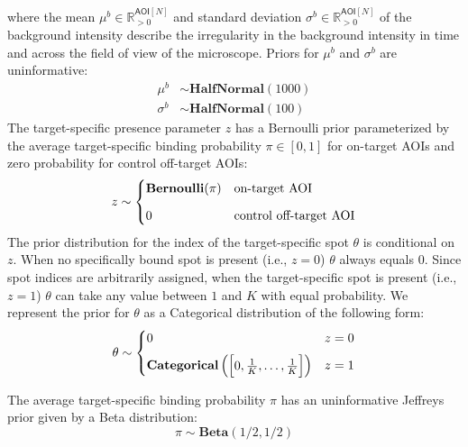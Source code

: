 \noindent
where the mean $\mu^b \in \mathbb{R}_{>0}^{\mathsf{AOI}[N]}$ and standard deviation $\sigma^b \in \mathbb{R}_{>0}^{\mathsf{AOI}[N]}$ of the background intensity describe the irregularity in the background intensity in time and across the field of view of the microscope. Priors for $\mu^b$ and $\sigma^b$ are uninformative:
%
\begin{subequations}
\begin{align}
    \mu^b &\sim \mathbf{HalfNormal}(1000) \\
    \sigma^b &\sim \mathbf{HalfNormal}(100)
\end{align}
\end{subequations}
%
The target-specific presence parameter $z$ has a Bernoulli prior parameterized by the average target-specific binding probability $\pi \in [0, 1] $ for on-target AOIs and zero probability for control off-target AOIs:
%
\begin{equation}
    z \sim
    \begin{cases}
        \mathbf{Bernoulli}(\pi) & \text{on-target AOI} \\
        0 & \text{control off-target AOI} \rule{0pt}{4ex}
    \end{cases}
\end{equation}
%
The prior distribution for the index of the target-specific spot $\theta$ is conditional on $z$. When no specifically bound spot is present (i.e., $z = 0$) $\theta$ always equals 0. Since spot indices are arbitrarily assigned, when the target-specific spot is present (i.e., $z = 1$) $\theta$ can take any value between $1$ and $K$ with equal probability. We represent the prior for $\theta$ as a Categorical distribution of the following form:
%
\begin{equation}
    \theta \sim
    \begin{cases}
        0 & z = 0 \\
        \mathbf{Categorical}\left( \begin{bmatrix} 0, \frac{1}{K}, \dots, \frac{1}{K} \end{bmatrix} \right) & z = 1 \rule{0pt}{4ex}
    \end{cases}
\end{equation}

The average target-specific binding probability $\pi$ has an uninformative Jeffreys prior \citep{Gelman2013-ro} given by a Beta distribution:
%
\begin{equation}
    \pi \sim \mathbf{Beta}(1/2, 1/2)
\end{equation}

